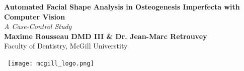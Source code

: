 \documentclass[a0,portrait]{a0poster}
\begin{document}


\begin{minipage}[b]{0.75\linewidth}
\Huge \color{NavyBlue} 
\textbf{Automated Facial Shape Analysis in Osteogenesis Imperfecta with
Computer Vision}
\color{Black}\\ %
\Huge\textit{A Case-Control Study}\\[1cm] %
\Large \textbf{Maxime Rousseau DMD III \& Dr. Jean-Marc Retrouvey}\\ %
\Large Faculty of Dentistry, McGill Universtity\\ %
\end{minipage}

\begin{minipage}[b]{0.19\linewidth}
  \vbox{\vspace{-50em}
\hbox{
	\hspace{80em}\texttt{[image: mcgill\_logo.png]}
	\vspace{5em}
} %
}
\end{minipage}

\end{document}
